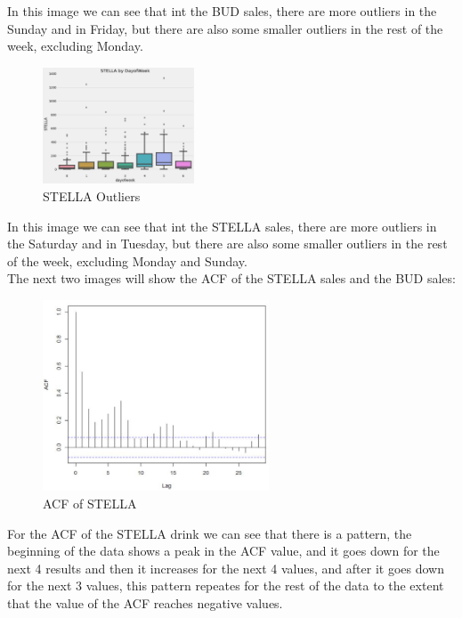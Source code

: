     In this image we can see that int the BUD sales, there are more outliers in the Sunday and in Friday, but there are also some smaller outliers in the rest of the week, excluding Monday. \\


\begin{figure}[H]
    \centering
    \includegraphics[width=0.4\textwidth]{assets/stella-outliers.jpeg}
    \caption{STELLA Outliers}
    \label{fig:stella_outliers}
    \end{figure}


In this image we can see that int the STELLA sales, there are more outliers in the Saturday and in Tuesday, but there are also some smaller outliers in the rest of the week, excluding Monday and Sunday. \\


The next two images will show the ACF of the STELLA sales and the BUD sales:


    \begin{figure}[H]
        \centering
        \includegraphics[width=0.6\textwidth]{assets/ACF STELLA.jpeg}
        \caption{ACF of STELLA}
        \label{fig:stella_outliers}
        \end{figure}

For the ACF of the STELLA drink we can see that there is a pattern, the beginning of the data shows a peak in the ACF value, and it goes down for the next 4 results and then it increases for the next 4 values, and after it goes down for the next 3 values, this pattern repeates for the rest of the data to the extent that the value of the ACF reaches negative values.\\


